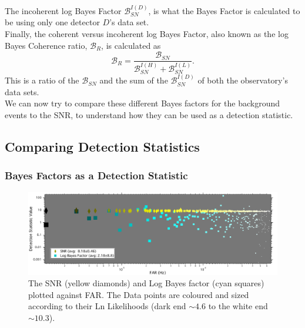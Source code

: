 \documentclass{article}
\begin{document}
The incoherent log Bayes Factor $\mathcal{B}_{SN}^{I(D)}$,  is what the Bayes Factor is calculated to be using only one detector $D$'s data set. \\ 

Finally, the coherent versus incoherent log Bayes Factor, also known as the log Bayes Coherence ratio, $\mathcal{B}_{R}$,  is calculated as 
 \begin{equation}\label{eq:BCR}
 \mathcal{B}_{R} = \frac{\mathcal{B}_{SN}}{\mathcal{B}_{SN}^{I(H)}+\mathcal{B}_{SN}^{I(L)}}.
 \end{equation}
This is a ratio of the $\mathcal{B}_{SN}$ and the sum of the $\mathcal{B}_{SN}^{I(D)}$ of both the observatory's data sets.\\

We can now try to compare these different Bayes factors for the background events to the SNR, to understand how they can be used as a detection statistic. \\



\subsection{Comparing Detection Statistics}
\label{section:Comparing Detection Statistics}
        
 \subsubsection{Bayes Factors as a Detection Statistic}
 
          \begin{figure}[h]
          	\centering
          	\includegraphics[width=1\textwidth]{Figures/DetectionStatVSfar_bF.pdf} 
          	\caption{The SNR (yellow diamonds) and Log Bayes factor (cyan squares) plotted against FAR. The Data points are coloured and sized according to their Ln Likelihoods (dark end $\sim4.6 $ to the white end $\sim10.3$).}
          	\label{Fig:BayesVSFAR}
          \end{figure}
         
\end{document}
